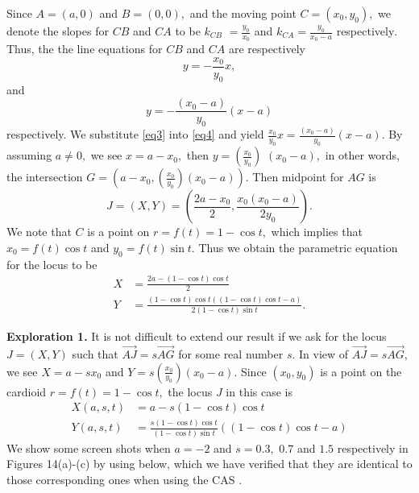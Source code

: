 \documentclass[12pt,a4paper]{article}%
\begin{document}
Since $A=(a,0)$ and $B=(0,0),$ and the moving point $C=(x_{0},y_{0}),$ we
denote the slopes for $CB$ and $CA$ to be $k_{CB}$ $=\frac{y_{0}}{x_{0}}$ and
$k_{CA}=\frac{y_{0}}{x_{0}-a}$ respectively$.$ Thus, the the line equations
for $CB$ and $CA$ are respectively%
\begin{equation}
y=-\frac{x_{0}}{y_{0}}x,\label{eq3}%
\end{equation}
and%
\begin{equation}
y=-\frac{\left(  x_{0}-a\right)  }{y_{0}}\left(  x-a\right) \label{eq4}%
\end{equation}
respectively. We substitute \ref{eq3} into \ref{eq4} and yield $\frac{x_{0}%
}{y_{0}}x=\frac{\left(  x_{0}-a\right)  }{y_{0}}\left(  x-a\right)  $. By
assuming $a\neq0,$ we see $x=a-x_{0},$ then $y=\left(  \frac{x_{0}}{y_{0}%
}\right)  $ $\left(  x_{0}-a\right)  ,$ in other words, the intersection
$G=(a-x_{0},\allowbreak\left(  \frac{x_{0}}{y_{0}}\right)  \left(
x_{0}-a\right)  ).$ Then midpoint for $AG$ is
\[
J=\left(  X,Y\right)  =\left(  \frac{2a-x_{0}}{2},\frac{x_{0}\left(
x_{0}-a\right)  }{2y_{0}}\right)  .
\]
We note that $C$ is a point on $r=f(t)=1-\cos t,$ which implies that
$x_{0}=f(t)\cos t$ and $y_{0}=f(t)\sin t.$ Thus we obtain the parametric
equation for the locus to be
\begin{align*}
X  & =\frac{2a-\left(  1-\cos t\right)  \cos t}{2}\\
Y  & =\frac{\left(  1-\cos t\right)  \cos t\left(  \left(  1-\cos t\right)
\cos t-a\right)  }{2\left(  1-\cos t\right)  \sin t}.
\end{align*}


\textbf{Exploration 1. }It is not difficult to extend our result if we ask for
the locus $J=(X,Y)$ such that $\overrightarrow{AJ}=s\overrightarrow{AG}$ for
some real number $s.$ In view of $\overrightarrow{AJ}=s\overrightarrow{AG},$
we see $X=a-sx_{0}$ and $Y=s\left(  \frac{x_{0}}{y_{0}}\right)  \left(
x_{0}-a\right)  $. Since $\left(  x_{0},y_{0}\right)  $ is a point on the
cardioid $r=f(t)=1-\cos t,$ the locus $J$ in this case is
\begin{align}
X(a,s,t)  & =a-s\left(  1-\cos t\right)  \cos t\label{cardioid}\\
Y(a,s,t)  & =\frac{s\left(  1-\cos t\right)  \cos t}{\left(  1-\cos t\right)
\sin t}\left(  \left(  1-\cos t\right)  \cos t-a\right) \nonumber
\end{align}
We show some screen shots when $a=-2$ and $s=0.3,$ $0.7$ and $1.5$
respectively in Figures 14(a)-(c) by using \cite{GE} below, which we have
verified that they are identical to those corresponding ones when using the
CAS \cite{Maple}.
\end{document}
